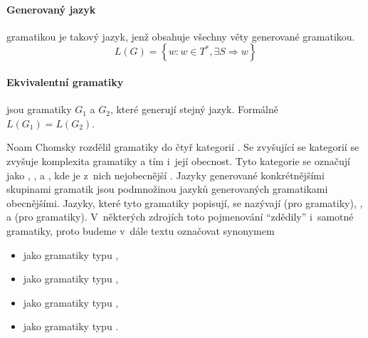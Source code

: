 		\paragraph{Generovaný jazyk }
		gramatikou  \GrammarDef\space je takový jazyk, jenž obsahuje všechny věty generované gramatikou. 
		$$L(G)=\left\{ w:w\in{T}^{*},\exists S \Rightarrow w \right\}$$
		\paragraph{Ekvivalentní gramatiky}
		jsou gramatiky $G_1$ a $G_2$, které generují stejný jazyk. Formálně $L(G_1)=L(G_2)$.
		
		\vspace{1em}
		
		Noam Chomsky rozdělil gramatiky do čtyř kategorií \cite{Meduna:2014:FLC:2636678}. Se zvyšující se kategorií se zvyšuje komplexita gramatiky a tím i~její obecnost. Tyto kategorie se označují jako , ,  a , kde  je z~nich nejobecnější \cite{chomsky59}. 
		Jazyky generované konkrétnějšími skupinami gramatik jsou podmnožinou jazyků generovaných gramatikami obecnějšími. 
		Jazyky, které tyto gramatiky popisují, se nazývají  (pro  gramatiky), ,  a  (pro  gramatiky). 
		V~některých zdrojích toto pojmenování \enquote{zdědily} i~samotné gramatiky, proto budeme v~dále textu označovat synonymem
		\begin{itemize}
			\item {} jako gramatiky typu ,
			\item {} jako gramatiky typu ,
			\item {} jako gramatiky typu ,
			\item {} jako gramatiky typu .
		\end{itemize}
		

